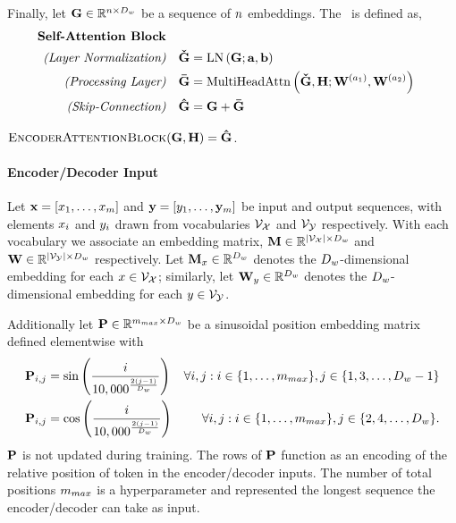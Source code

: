            \noindent Finally, let $\mathbf{G} \in \mathbb{R}^{n \times D_{w}}$ be a sequence of $n$ embeddings. The \encoderattentionblock~is
           defined as,
   \begin{align*}
       \textbf{Self-Attention Block} & \\
       \textit{(Layer Normalization)} & & 
            \boldsymbol{\check{\mathbf{G}}} &
            =  \operatorname{LN}\left(\mathbf{G}; \mathbf{a}, \mathbf{b} \right) \\
            \textit{(Processing Layer)} &  & \boldsymbol{\bar{\mathbf{G}}} &=  \operatorname{MultiHeadAttn}\left(\boldsymbol{\check{\mathbf{G}}}, \mathbf{H}; \mathbf{W}^{(a_1)},  \mathbf{W}^{(a_2)}\right)  \\
        \textit{(Skip-Connection)} & & \boldsymbol{\hat{\mathbf{G}}} &= \mathbf{G} + \boldsymbol{\bar{\mathbf{G}}}\end{align*}
       \begin{center}  {$\textsc{EncoderAttentionBlock}(\mathbf{G}, \mathbf{H}) =  {\boldsymbol{\hat{\mathbf{G}}}}$.}\end{center}

           \paragraph{Encoder/Decoder Input}
           Let $\mathbf{x} = \left[ x_1,\ldots,x_{m}\right]$ and 
           $\mathbf{y} = \left[y_1,\ldots,\mathbf{y}_{m}\right]$ be 
           input and output sequences, with elements $x_i$ and $y_i$
           drawn from vocabularies $\mathcal{V}_{\mathcal{X}}$ and $\mathcal{V}_{\mathcal{Y}}$ respectively.
           With each vocabulary we associate an embedding matrix,
          $\mathbf{M} \in \mathbb{R}^{{\left\vert \mathcal{V}_{\mathcal{X}} \right\vert} \times D_{w}}$ 
          and 
          $\mathbf{W} \in \mathbb{R}^{{\left\vert \mathcal{V}_{\mathcal{Y}} \right\vert} \times D_{w}}$ 
          respectively. Let $\mathbf{M}_{x} \in \mathbb{R}^{D_{w}}$ denotes the $D_{w}$-dimensional  embedding for each $x \in \mathcal{V}_{\mathcal{X}}$; similarly,  
let $\mathbf{W}_y \in \mathbb{R}^{D_{w}}$ denotes the $D_{w}$-dimensional  embedding for each $y \in \mathcal{V}_{\mathcal{Y}}$.

  Additionally let $\mathbf{P} \in \mathbb{R}^{m_{max} \times D_{w}}$ be a sinusoidal position embedding matrix
  defined elementwise with 
 \begin{align*}
     \mathbf{P}_{i,j} & = \sin\left(\frac{i}{10,000^{ \frac{2(j-1)}{D_{w}} }}\right) & \forall i,j : i \in \{1,\ldots,m_{max}\}, j \in \{1,3,\ldots, D_{w} - 1\} \\
     \mathbf{P}_{i,j} & = \cos\left(\frac{i}{10,000^{ \frac{2(j-1)}{D_{w}} }}\right) & \forall i,j : i \in \{1,\ldots, m_{max}\}, j \in \{2,4,\ldots,D_{w}\}. 
  \end{align*} $\mathbf{P}$ is not updated during training. The rows of $\mathbf{P}$
  function as an encoding of the relative position of token in the encoder/decoder inputs. The number of total positions $m_{max}$ is a hyperparameter
  and represented the longest sequence the encoder/decoder can take as input.

